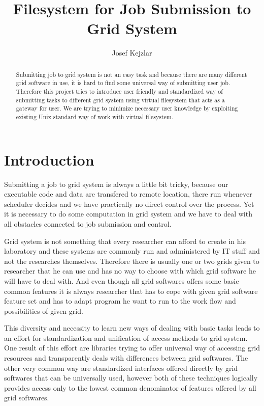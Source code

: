 \documentclass[a4paper,10pt,twocolumn]{article}
\title{Filesystem for Job Submission to Grid System}
\author{Josef Kejzlar}
\begin{document}
\maketitle

\begin{abstract}
Submitting job to grid system is not an easy task and because there are many different grid software in use, it is hard to find some universal way of submitting user job. Therefore this project tries to introduce user friendly and standardized way of submitting tasks to different grid system using virtual filesystem that acts as a gateway for user. We are trying to minimize necessary user knowledge by exploiting existing Unix standard way of work with virtual filesystem.
\end{abstract}

\section{Introduction}

Submitting a job to grid system is always a little bit tricky, because our executable code and data are transfered to remote location, there run whenever scheduler decides and we have practically no direct control over the process. Yet it is necessary to do some computation in grid system and we have to deal with all obstacles connected to job submission and control.

Grid system is not something that every researcher can afford to create in his laboratory and these systems are commonly run and administered by IT stuff and not the researches themselves. Therefore there is usually one or two grids given to researcher that he can use and has no way to choose with which grid software he will have to deal with. And even though all grid softwares offers some basic common features it is always researcher that has to cope with given grid software feature set and has to adapt program he want to run to the work flow and possibilities of given grid. 

This diversity and necessity to learn new ways of dealing with basic tasks leads to an effort for standardization and unification of access methods to grid system. One result of this effort are libraries trying to offer universal way of accessing grid resources and transparently deals with differences between grid softwares. The other very common way are standardized interfaces offered directly by grid softwares that can be universally used, however both of these techniques logically provides access only to the lowest common denominator of features offered by all grid softwares.
\end{document}
